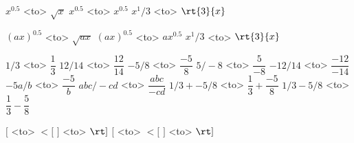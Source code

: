 $x^0.5$ <to> $\sqrt{x}$
$x^{0.5}$ <to> $x^{0.5}$
$x^1/3$ <to> $\rt{3}{x}$

$(ax)^0.5$ <to> $\sqrt{ax}$
$(ax)^{0.5}$ <to> ${ax}^{0.5}$
$x^1/3$ <to> $\rt{3}{x}$


$1/3$ <to> $\dfrac{1}{3}$
$12/14$ <to> $\dfrac{12}{14}$
$-5/8$ <to> $\dfrac{-5}{8}$
$5/-8$ <to> $\dfrac{5}{-8}$
$-12/14$ <to> $\dfrac{-12}{-14}$
$-5a/b$ <to> $\dfrac{-5}{b}$
$abc/-cd$ <to> $\dfrac{abc}{-cd}$
$1/3 + -5/8$ <to> $\dfrac{1}{3} + \dfrac{-5}{8}$
$1/3 - 5/8$ <to> $\dfrac{1}{3} - \dfrac{5}{8}$






$[$ <to> $\lt[$
$]$ <to> $\rt]$
$[$ <to> $\lt[$
$]$ <to> $\rt]$



